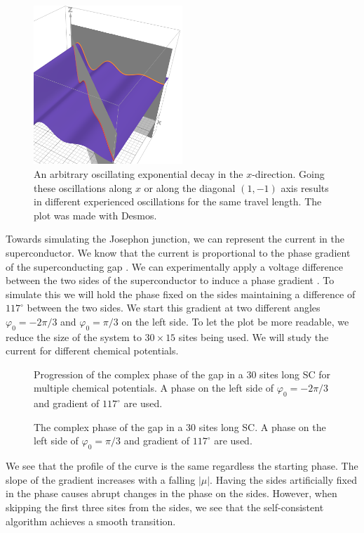 \documentclass[..\main.tex]{subfile}
\begin{document}
\begin{figure}[H]
  \centering
  \includegraphics[width=0.5\textwidth]{Ressources/CooperPairsOrient.PNG}
  \caption{An arbitrary oscillating exponential decay in the $x$-direction. Going these oscillations along $x$ or along the diagonal $(1,-1)$ axis results in different
  experienced oscillations for the same travel length. The plot was made with Desmos.}
\end{figure}
Towards simulating the Josephon junction, we can represent the current in the superconductor.
We know that the current is proportional to the phase gradient of the superconducting gap \cite{Orlando2003}.
We can experimentally apply a voltage difference between the two sides of the superconductor to induce a phase gradient \cite{Orlando2003}.
To simulate this we will hold the phase fixed on the sides maintaining a difference of $117^{\circ}$ between the two sides.
We start this gradient at two different angles $\varphi_0 = -2\pi/3$ and $\varphi_0 = \pi/3$ on the left side.
To let the plot be more readable, we reduce the size of the system to $30\times15$ sites being used.
We will study the current for different chemical potentials.
\begin{figure}[H]
    
    \caption{Progression of the complex phase of the gap in a 30 sites long SC for multiple chemical potentials.
     A phase on the left side of $\varphi_0 = -2\pi/3$ and gradient of $117^{\circ}$ are used.}
    \label{fig:Phase-2pi3}
\end{figure}
\begin{figure}[H]
    
    \caption{The complex phase of the gap in a 30 sites long SC. A phase on the left side of $\varphi_0 = \pi/3$ and gradient of $117^{\circ}$ are used.}
    \label{fig:Phasepi3}
\end{figure}
We see that the profile of the curve is the same regardless the starting phase. The slope of the gradient increases with a falling $|\mu|$.
Having the sides artificially fixed in the phase causes abrupt changes in the phase on the sides. However, when skipping the first
three sites from the sides, we see that the self-consistent algorithm achieves a smooth transition. 
\end{document}
